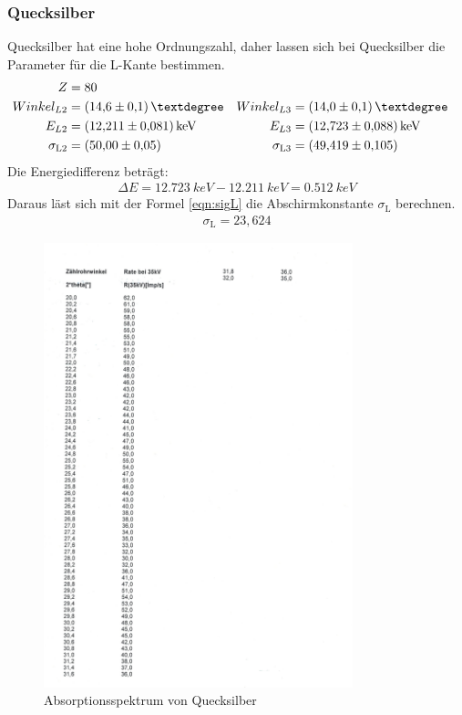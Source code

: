 \subsubsection{Quecksilber}
Quecksilber hat eine hohe Ordnungszahl, daher lassen sich bei Quecksilber die Parameter für die L-Kante bestimmen.
\begin{align*}
  Z&=80\\
  Winkel_{L2}&=\SI{14,6\pm0,1}{°}       &Winkel_{L3}&=\SI{14\pm0,1}{°}\\
  E_{L2}&=\SI{12,211\pm0,081}{keV}      &E_{L3}&=\SI{12,723\pm0,088}{keV}\\
  \sigma_{\text{L2}}&=\SI{50\pm0,05}{}  &\sigma_{\text{L3}}&=\SI{49,419\pm0,105}{}
\end{align*}
Die Energiedifferenz beträgt:
\begin{align*}
  \Delta E=\SI{12,723}{keV}-\SI{12,211}{keV}=\SI{0,512}{keV}
\end{align*}
Daraus läst sich mit der Formel \ref{eqn:sigL} die Abschirmkonstante $\sigma_{\text{L}}$ berechnen.
\begin{align*}
  \sigma_{\text{L}}=23,624
\end{align*}
\begin{figure}[h!]
  \centering
  \includegraphics[width=0.8\textwidth]{quecksilbertab.pdf}
  \caption{Absorptionsspektrum von Quecksilber}
  \label{tab:quecksilber}
\end{figure}
